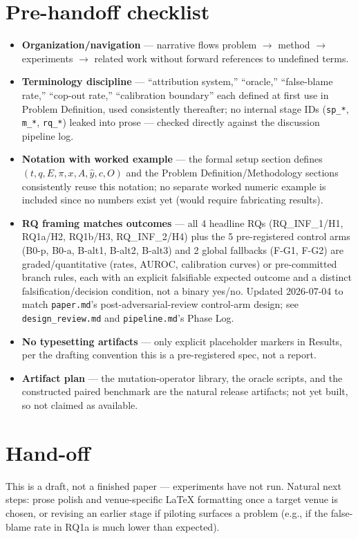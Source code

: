 \documentclass[11pt]{article}
\begin{document}
\section*{Pre-handoff checklist}
\begin{itemize}[leftmargin=1.4em]
\item \textbf{Organization/navigation} --- narrative flows problem $\to$ method $\to$ experiments $\to$ related work without forward references to undefined terms.
\item \textbf{Terminology discipline} --- ``attribution system,'' ``oracle,'' ``false-blame rate,'' ``cop-out rate,'' ``calibration boundary'' each defined at first use in Problem Definition, used consistently thereafter; no internal stage IDs (\texttt{sp\_*}, \texttt{m\_*}, \texttt{rq\_*}) leaked into prose --- checked directly against the discussion pipeline log.
\item \textbf{Notation with worked example} --- the formal setup section defines $(t, q, E, \pi, x, A, \hat{y}, c, O)$ and the Problem Definition/Methodology sections consistently reuse this notation; no separate worked numeric example is included since no numbers exist yet (would require fabricating results).
\item \textbf{RQ framing matches outcomes} --- all 4 headline RQs (RQ\_INF\_1/H1, RQ1a/H2, RQ1b/H3, RQ\_INF\_2/H4) plus the 5 pre-registered control arms (B0-p, B0-a, B-alt1, B-alt2, B-alt3) and 2 global fallbacks (F-G1, F-G2) are graded/quantitative (rates, AUROC, calibration curves) or pre-committed branch rules, each with an explicit falsifiable expected outcome and a distinct falsification/decision condition, not a binary yes/no. Updated 2026-07-04 to match \texttt{paper.md}'s post-adversarial-review control-arm design; see \texttt{design\_review.md} and \texttt{pipeline.md}'s Phase Log.
\item \textbf{No typesetting artifacts} --- only explicit placeholder markers in Results, per the drafting convention this is a pre-registered spec, not a report.
\item \textbf{Artifact plan} --- the mutation-operator library, the oracle scripts, and the constructed paired benchmark are the natural release artifacts; not yet built, so not claimed as available.
\end{itemize}

\section*{Hand-off}
This is a draft, not a finished paper --- experiments have not run. Natural next steps: prose polish and venue-specific LaTeX formatting once a target venue is chosen, or revising an earlier stage if piloting surfaces a problem (e.g., if the false-blame rate in RQ1a is much lower than expected).



\end{document}
